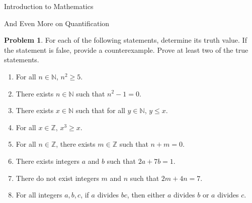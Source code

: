 \documentclass[11pt]{article}
\theoremstyle{definition}
\newtheorem{problem}[theorem]{Problem}
\begin{document}
\begin{section}{Introduction to Mathematics}
\begin{subsection}{And Even More on Quantification}
\begin{problem}
For each of the following statements, determine its truth value.  If the statement is false, provide a counterexample.  Prove at least two of the true statements.
\begin{enumerate}
\item For all $n\in\mathbb{N}$, $n^2\geq 5$.

\item There exists $n \in \mathbb{N}$ such that $n^2-1=0$.


\item There exists $x \in \mathbb{N}$ such that for all $y \in \mathbb{N}$, $y \leq x$.

\item For all $x\in\mathbb{Z}$, $x^3\geq x$.

\item For all $n\in\mathbb{Z}$, there exists $m\in\mathbb{Z}$ such that $n+m=0$.

\item There exists integers $a$ and $b$ such that $2a+7b=1$.

\item There do not exist integers $m$ and $n$ such that $2m+4n=7$.

\item For all integers $a, b, c$, if $a$ divides $bc$, then either $a$ divides $b$ or $a$ divides $c$.



\end{enumerate}

\end{problem}

\end{subsection}

\end{section}
\end{document}
